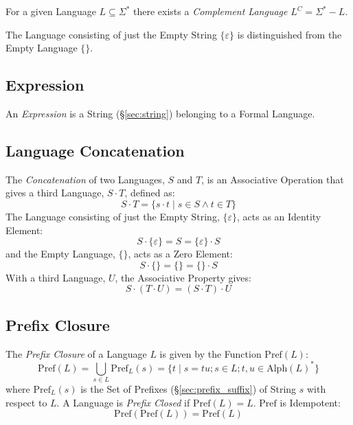 For a given Language $L \subseteq \Sigma^*$ there exists a
\emph{Complement Language} $L^C = \Sigma^* - L$.

The Language consisting of just the Empty String $\{\varepsilon\}$ is
distinguished from the Empty Language $\{\}$.



\subsection{Expression}\label{sec:expression}

An \emph{Expression} is a String (\S\ref{sec:string}) belonging to a
Formal Language.



\subsection{Language Concatenation}\label{sec:language_concatenation}

The \emph{Concatenation} of two Languages, $S$ and $T$, is an
Associative Operation that gives a third Language, $S \cdot T$,
defined as:
\[
  S \cdot T = \{s \cdot t\;|\; s \in S \wedge t \in T\}
\]
The Language consisting of just the Empty String, $\{\varepsilon\}$,
acts as an Identity Element:
\[
  S \cdot \{\varepsilon\} = S = \{\varepsilon\} \cdot S
\]
and the Empty Language, $\{\}$, acts as a Zero Element:
\[
  S \cdot \{\} = \{\} = \{\} \cdot S
\]
With a third Language, $U$, the Associative Property gives:
\[
  S \cdot (T \cdot U) = (S \cdot T) \cdot U
\]



\subsection{Prefix Closure}\label{sec:prefix_closure}

The \emph{Prefix Closure} of a Language $L$ is given by the Function
$\mathrm{Pref}(L)$:
\[
  \mathrm{Pref}(L) = \bigcup_{s \in L} \mathrm{Pref}_L(s) =
  \{ t\;|\;s = tu; s \in L; t,u \in \mathrm{Alph}(L)^* \}
\]
where $\mathrm{Pref}_L(s)$ is the Set of Prefixes
(\S\ref{sec:prefix_suffix}) of String $s$ with respect to $L$. A
Language is \emph{Prefix Closed} if $\mathrm{Pref}(L) = L$.
$\mathrm{Pref}$ is Idempotent:
\[
  \mathrm{Pref}(\mathrm{Pref}(L)) = \mathrm{Pref}(L)
\]



